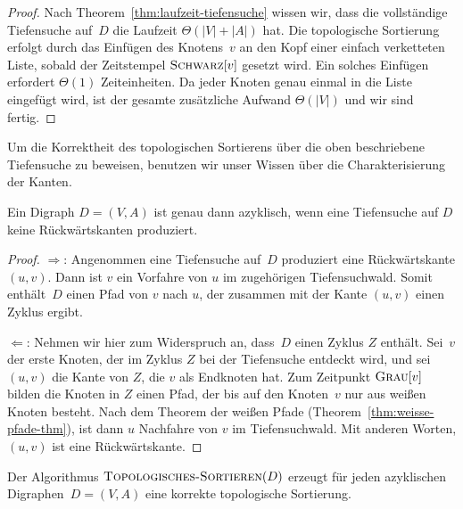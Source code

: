 \begin{proof}
Nach Theorem~\ref{thm:laufzeit-tiefensuche} wissen wir, dass die vollständige Tiefensuche auf~$D$ die Laufzeit $\Theta(|V|+|A|)$ hat.
Die topologische Sortierung erfolgt durch das Einfügen des Knotens~$v$ an den Kopf einer einfach verketteten Liste, sobald der Zeitstempel $\mathop{\text{\textsc{Schwarz}}}[v]$ gesetzt wird.
Ein solches Einfügen erfordert $\Theta(1)$ Zeiteinheiten.
Da jeder Knoten genau einmal in die Liste eingefügt wird, ist der gesamte zusätzliche Aufwand $\Theta(|V|)$ und wir sind fertig.
\end{proof}

\begin{bem} 
Um die Korrektheit des topologischen Sortierens über die oben beschriebene Tiefensuche zu beweisen, benutzen wir unser Wissen über die Charakterisierung der Kanten.
\end{bem} 

\begin{lem}
\label{lem:azyklisch-rueckwarts}
Ein Digraph $D=(V,A)$ ist genau dann azyklisch, wenn eine Tiefensuche auf $D$ keine Rückwärtskanten produziert.
\end{lem}

\begin{proof}
\glqq $\Longrightarrow$\grqq: Angenommen eine Tiefensuche auf~$D$ produziert eine Rückwärtskante $(u,v)$.
Dann ist $v$ ein Vorfahre von $u$ im zugehörigen Tiefensuchwald.
Somit enthält~$D$ einen Pfad von $v$ nach $u$, der zusammen mit der Kante $(u,v)$ einen Zyklus ergibt.

\glqq $\Longleftarrow$\grqq: Nehmen wir hier zum Widerspruch an, dass~$D$ einen Zyklus $Z$ enthält.
Sei~$v$ der erste Knoten, der im Zyklus $Z$ bei der Tiefensuche entdeckt wird, und sei $(u,v)$ die Kante von $Z$, die $v$ als Endknoten hat.
Zum Zeitpunkt $\mathop{\text{\textsc{Grau}}}[v]$ bilden die Knoten in $Z$ einen Pfad, der bis auf den Knoten~$v$ nur aus weißen Knoten besteht.
Nach dem Theorem der weißen Pfade (Theorem~\ref{thm:weisse-pfade-thm}), ist dann $u$ Nachfahre von $v$ im Tiefensuchwald.
Mit anderen Worten, $(u,v)$ ist eine Rückwärtskante.
\end{proof}

\begin{thm}
Der Algorithmus $\mathop{\text{\textsc{Topologisches-Sortieren}}}(D)$ erzeugt für jeden azyklischen Digraphen~$D=(V,A)$ eine korrekte topologische Sortierung.
\end{thm}


